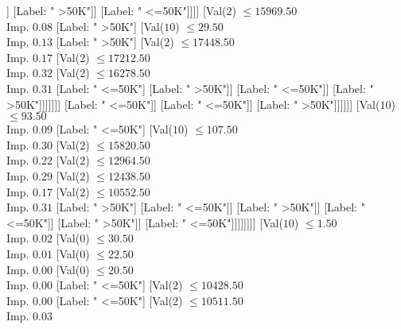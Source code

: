 \documentclass[margin=10pt]{standalone}
\begin{document}
\begin{forest}
																		[Label: " <=50K"]
																		[Val($2$) $ \leq 13613.50$ \\ Imp. $0.32$
																			[Val($2$) $ \leq 13142.50$ \\ Imp. $0.31$
																				[Val($2$) $ \leq 13053.50$ \\ Imp. $1.00$
																					[Label: " >50K"]
																					[Label: " <=50K"]]
																				[Label: " >50K"]]
																			[Label: " <=50K"]]]]
																[Val($2$) $ \leq 15969.50$ \\ Imp. $0.08$
																	[Label: " >50K"]
																	[Val($10$) $ \leq 29.50$ \\ Imp. $0.13$
																		[Label: " >50K"]
																		[Val($2$) $ \leq 17448.50$ \\ Imp. $0.17$
																			[Val($2$) $ \leq 17212.50$ \\ Imp. $0.32$
																				[Val($2$) $ \leq 16278.50$ \\ Imp. $0.31$
																					[Label: " <=50K"]
																					[Label: " >50K"]]
																				[Label: " <=50K"]]
																			[Label: " >50K"]]]]]]]
													[Label: " <=50K"]]
												[Label: " <=50K"]]
											[Label: " >50K"]]]]]]
						[Val($10$) $ \leq 93.50$ \\ Imp. $0.09$
							[Label: " <=50K"]
							[Val($10$) $ \leq 107.50$ \\ Imp. $0.30$
								[Val($2$) $ \leq 15820.50$ \\ Imp. $0.22$
									[Val($2$) $ \leq 12964.50$ \\ Imp. $0.29$
										[Val($2$) $ \leq 12438.50$ \\ Imp. $0.17$
											[Val($2$) $ \leq 10552.50$ \\ Imp. $0.31$
												[Label: " >50K"]
												[Label: " <=50K"]]
											[Label: " >50K"]]
										[Label: " <=50K"]]
									[Label: " >50K"]]
								[Label: " <=50K"]]]]]]]]
	[Val($10$) $ \leq 1.50$ \\ Imp. $0.02$
		[Val($0$) $ \leq 30.50$ \\ Imp. $0.01$
			[Val($0$) $ \leq 22.50$ \\ Imp. $0.00$
				[Val($0$) $ \leq 20.50$ \\ Imp. $0.00$
					[Label: " <=50K"]
					[Val($2$) $ \leq 10428.50$ \\ Imp. $0.00$
						[Label: " <=50K"]
						[Val($2$) $ \leq 10511.50$ \\ Imp. $0.03$

\end{forest}
\end{document}
